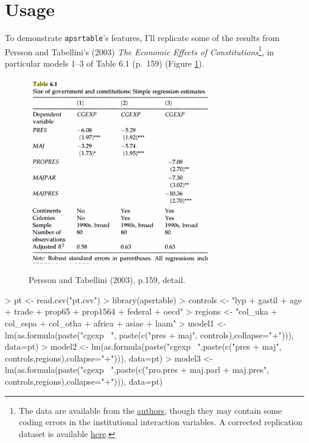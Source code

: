 \documentclass[10pt]{article} %
\begin{document}
\section{Usage}
\label{sec:usage}

To demonstrate \texttt{apsrtable}'s features, I'll replicate some of the results from Persson and Tabellini's (2003) \textit{The Economic Effects of Constitutions}\footnote{The data are available from the \href{http://www.igier.unibocconi.it/whos.php?vedi=1169&tbn=albero&id_folder=177}{authors}, though they may contain some coding errors in the institutional interaction variables. A corrected replication dataset is available \href{http://malecki.wustl.edu/pt.csv}{here}.}, in particular models 1--3 of Table 6.1 (p.~159) (Figure \ref{fig:ptimage}).
\begin{figure}[htb]
  \centering
  \caption{Persson and Tabellini (2003), p.159, detail.}
  \includegraphics[width=8cm]{pt-table.png}
  \label{fig:ptimage}
\end{figure}
\begin{Schunk}
\begin{Sinput}
> pt <- read.csv("pt.csv")
> library(apsrtable)
> controls <- "lyp + gastil + age + trade + prop65 + prop1564 + federal + oecd"
> regions <- "col_uka + col_espa + col_otha + africa + asiae + laam"
> model1 <- lm(as.formula(paste("cgexp ~", paste(c("pres + maj",
                                                  controls),collapse="+"))), data=pt)
> model2 <- lm(as.formula(paste("cgexp ~",paste(c("pres + maj",
                                                 controls,regions),collapse="+"))), data=pt)
> model3 <- lm(as.formula(paste("cgexp ~",paste(c("pro.pres + maj.parl + maj.pres",
                                                 controls,regions),collapse="+"))), data=pt)
\end{Sinput}
\end{Schunk}
\end{document}
